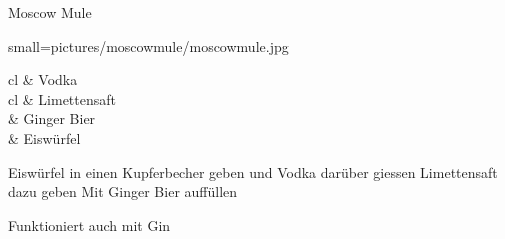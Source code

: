 \begin{recipe}
	[
	preparationtime = {\unit[5]{min}},
	bakingtime,
	bakingtemperature,
	portion = {\portion{1}},
	calory,
	source
	]
	{Moscow Mule}
	
	\graph
	{
		small=pictures/moscowmule/moscowmule.jpg
	}
	
	\ingredients
	{
		\unit[5]{cl} & Vodka \\
		\unit[2]{cl} & Limettensaft \\
	    & Ginger Bier \\
		& Eiswürfel \\
	}
	
	\preparation
	{
		\step Eiswürfel in einen Kupferbecher geben und Vodka darüber giessen
		\step Limettensaft dazu geben
		\step Mit Ginger Bier auffüllen
	}

	\hint	
	{
		Funktioniert auch mit Gin
	}
\end{recipe}